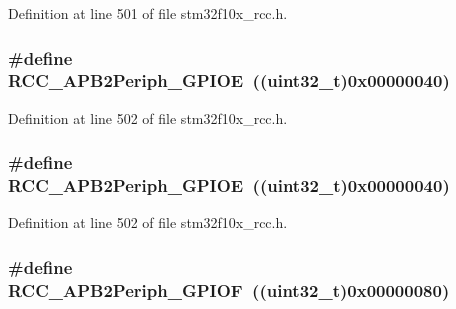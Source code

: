Definition at line 501 of file stm32f10x\+\_\+rcc.\+h.

\subsubsection[{\texorpdfstring{R\+C\+C\+\_\+\+A\+P\+B2\+Periph\+\_\+\+G\+P\+I\+OE}{RCC_APB2Periph_GPIOE}}]{\setlength{\rightskip}{0pt plus 5cm}\#define R\+C\+C\+\_\+\+A\+P\+B2\+Periph\+\_\+\+G\+P\+I\+OE~(({\bf uint32\+\_\+t})0x00000040)}\hypertarget{group___a_p_b2__peripheral_gabc736c9892278ccd15848c6137d991fc}{}\label{group___a_p_b2__peripheral_gabc736c9892278ccd15848c6137d991fc}


Definition at line 502 of file stm32f10x\+\_\+rcc.\+h.

\subsubsection[{\texorpdfstring{R\+C\+C\+\_\+\+A\+P\+B2\+Periph\+\_\+\+G\+P\+I\+OE}{RCC_APB2Periph_GPIOE}}]{\setlength{\rightskip}{0pt plus 5cm}\#define R\+C\+C\+\_\+\+A\+P\+B2\+Periph\+\_\+\+G\+P\+I\+OE~(({\bf uint32\+\_\+t})0x00000040)}\hypertarget{group___a_p_b2__peripheral_gabc736c9892278ccd15848c6137d991fc}{}\label{group___a_p_b2__peripheral_gabc736c9892278ccd15848c6137d991fc}


Definition at line 502 of file stm32f10x\+\_\+rcc.\+h.

\subsubsection[{\texorpdfstring{R\+C\+C\+\_\+\+A\+P\+B2\+Periph\+\_\+\+G\+P\+I\+OF}{RCC_APB2Periph_GPIOF}}]{\setlength{\rightskip}{0pt plus 5cm}\#define R\+C\+C\+\_\+\+A\+P\+B2\+Periph\+\_\+\+G\+P\+I\+OF~(({\bf uint32\+\_\+t})0x00000080)}\hypertarget{group___a_p_b2__peripheral_ga2dbb1e1116b57621c585e1b52c894bda}{}\label{group___a_p_b2__peripheral_ga2dbb1e1116b57621c585e1b52c894bda}


